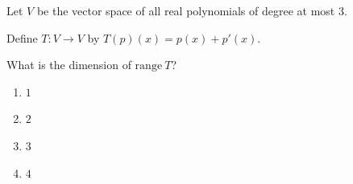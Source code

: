 \documentclass{article}
\begin{document}
\noindent
Let $V$ be the vector space of all real polynomials of degree at most $3$.

\noindent
Define $T : V \to V$ by $T(p)(x) = p(x) + p'(x)$.

\noindent
What is the dimension of $\mathrm{range}\ T$?

\begin{enumerate}
  \item $1$
  \item $2$
  \item $3$
  \item $4$
\end{enumerate}
\end{document}
